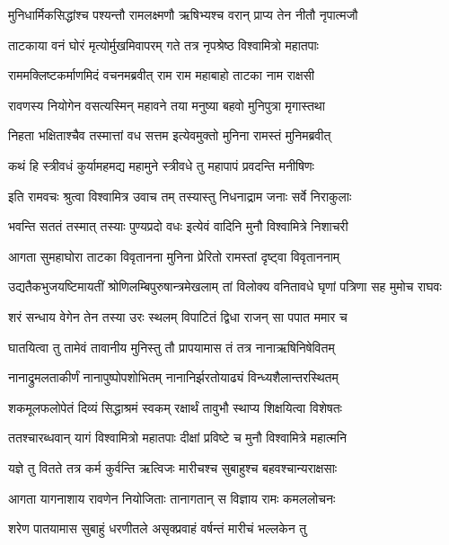 \twolineshloka
{मुनिधार्मिकसिद्धांश्च पश्यन्तौ रामलक्ष्मणौ}
{ऋषिभ्यश्च वरान् प्राप्य तेन नीतौ नृपात्मजौ} %

\twolineshloka
{ताटकाया वनं घोरं मृत्योर्मुखमिवापरम्}
{गते तत्र नृपश्रेष्ठ विश्वामित्रो महातपाः} %

\twolineshloka
{राममक्लिष्टकर्माणमिदं वचनमब्रवीत्}
{राम राम महाबाहो ताटका नाम राक्षसी} %

\twolineshloka
{रावणस्य नियोगेन वसत्यस्मिन् महावने}
{तया मनुष्या बहवो मुनिपुत्रा मृगास्तथा} %

\twolineshloka
{निहता भक्षिताश्चैव तस्मात्तां वध सत्तम}
{इत्येवमुक्तो मुनिना रामस्तं मुनिमब्रवीत्} %

\twolineshloka
{कथं हि स्त्रीवधं कुर्यामहमद्य महामुने}
{स्त्रीवधे तु महापापं प्रवदन्ति मनीषिणः} %

\twolineshloka
{इति रामवचः श्रुत्वा विश्वामित्र उवाच तम्}
{तस्यास्तु निधनाद्राम जनाः सर्वे निराकुलाः} %

\twolineshloka
{भवन्ति सततं तस्मात् तस्याः पुण्यप्रदो वधः}
{इत्येवं वादिनि मुनौ विश्वामित्रे निशाचरी} %

\twolineshloka
{आगता सुमहाघोरा ताटका विवृतानना}
{मुनिना प्रेरितो रामस्तां दृष्ट्वा विवृताननाम्} %

\twolineshloka
{उद्यतैकभुजयष्टिमायतीं श्रोणिलम्बिपुरुषान्त्रमेखलाम्}
{तां विलोक्य वनितावधे घृणां पत्रिणा सह मुमोच राघवः} %

\twolineshloka
{शरं सन्धाय वेगेन तेन तस्या उरः स्थलम्}
{विपाटितं द्विधा राजन् सा पपात ममार च} %

\twolineshloka
{घातयित्वा तु तामेवं तावानीय मुनिस्तु तौ}
{प्रापयामास तं तत्र नानाऋषिनिषेवितम्} %

\twolineshloka
{नानाद्रुमलताकीर्णं नानापुष्पोपशोभितम्}
{नानानिर्झरतोयाढ्यं विन्ध्यशैलान्तरस्थितम्} %

\twolineshloka
{शकमूलफलोपेतं दिव्यं सिद्धाश्रमं स्वकम्}
{रक्षार्थं तावुभौ स्थाप्य शिक्षयित्वा विशेषतः} %

\twolineshloka
{ततश्चारब्धवान् यागं विश्वामित्रो महातपाः}
{दीक्षां प्रविष्टे च मुनौ विश्वामित्रे महात्मनि} %

\twolineshloka
{यज्ञे तु वितते तत्र कर्म कुर्वन्ति ऋत्विजः}
{मारीचश्च सुबाहुश्च बहवश्चान्यराक्षसाः} %

\twolineshloka
{आगता यागनाशाय रावणेन नियोजिताः}
{तानागतान् स विज्ञाय रामः कमललोचनः} %

\twolineshloka
{शरेण पातयामास सुबाहुं धरणीतले}
{असृक्प्रवाहं वर्षन्तं मारीचं भल्लकेन तु} %

